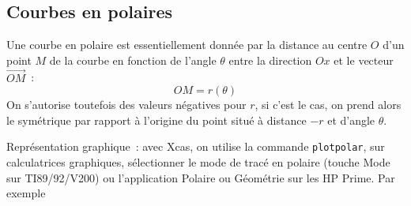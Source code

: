 \documentclass[a4paper,11pt]{article}
\begin{document}
\begin{giacjshere}
\subsection{Courbes en polaires}
Une courbe en polaire est essentiellement
donn\'ee par la distance au centre $O$ d'un
point $M$ de la courbe en fonction de l'angle $\theta$ 
entre la direction $Ox$ et le vecteur $\overrightarrow{OM}$~:
$$ OM = r(\theta)$$ 
On s'autorise toutefois des valeurs n\'egatives pour $r$,
si c'est le cas, on prend alors le sym\'etrique par rapport
\`a l'origine du point situ\'e \`a distance $-r$ et d'angle $\theta$.

Repr\'esentation graphique~: avec Xcas, on utilise
la commande \verb|plotpolar|, sur calculatrices
graphiques, s\'electionner le mode de trac\'e en polaire (touche Mode
sur TI89/92/V200) ou
l'application Polaire ou G\'eom\'etrie sur les HP Prime.
Par exemple 


\end{giacjshere}
\end{document}
